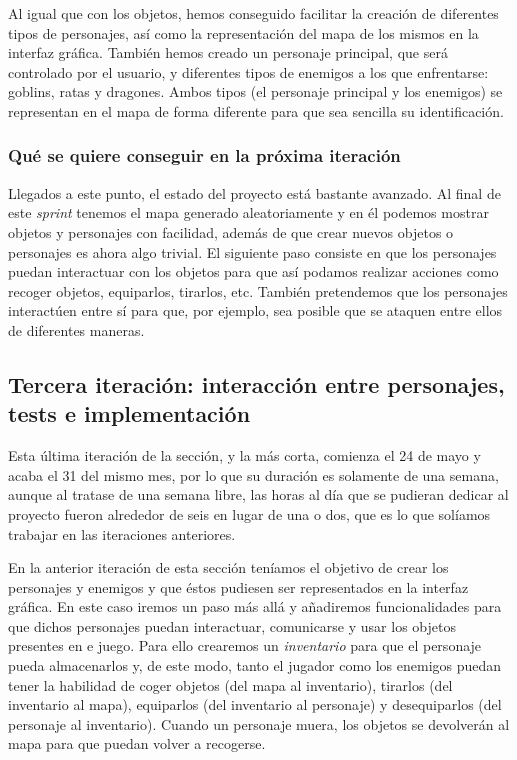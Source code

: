 Al igual que con los objetos, hemos conseguido facilitar la creación de diferentes tipos de personajes, así como la representación del mapa de los mismos en la interfaz gráfica. 
También hemos creado un personaje principal, que será controlado por el usuario, y diferentes tipos de enemigos a los que enfrentarse: goblins, ratas y dragones. Ambos tipos (el personaje principal y los enemigos) se representan en el mapa de forma diferente para que sea sencilla su identificación.

\subsubsection{Qué se quiere conseguir en la próxima iteración}

Llegados a este punto, el estado del proyecto está bastante avanzado. Al final de este \textit{sprint} tenemos el mapa generado aleatoriamente y en él podemos mostrar objetos y personajes con facilidad, además de que crear nuevos objetos o personajes es ahora algo trivial. El siguiente paso consiste en que los personajes puedan interactuar con los objetos para que así podamos realizar acciones como recoger objetos, equiparlos, tirarlos, etc. También pretendemos que los personajes interactúen entre sí para que, por ejemplo, sea posible que se ataquen entre ellos de diferentes maneras.

\subsection{Tercera iteración: interacción entre personajes, tests e implementación}

Esta última iteración de la sección, y la más corta, comienza el 24 de mayo y acaba el 31 del mismo mes, por lo que su duración es solamente de una semana, aunque al tratase de una semana libre, las horas al día que se pudieran dedicar al proyecto fueron alrededor de seis en lugar de una o dos, que es lo que solíamos trabajar en las iteraciones anteriores.

En la anterior iteración de esta sección teníamos el objetivo de crear los personajes y enemigos y que éstos pudiesen ser representados en la interfaz gráfica. En este caso iremos un paso más allá y añadiremos funcionalidades para que dichos personajes puedan interactuar, comunicarse y usar los objetos presentes en e juego. Para ello crearemos un \textit{inventario} para que el personaje pueda almacenarlos y, de este modo, tanto el jugador como los enemigos puedan tener la habilidad de coger objetos (del mapa al inventario), tirarlos (del inventario al mapa), equiparlos (del inventario al personaje) y desequiparlos (del personaje al inventario). Cuando un personaje muera, los objetos se devolverán al mapa para que puedan volver a recogerse.

